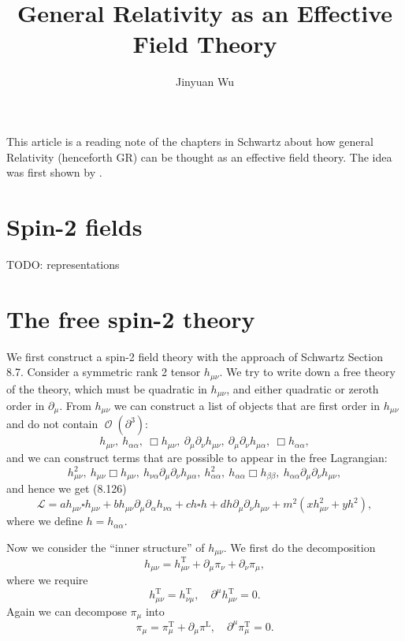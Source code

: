 \documentclass[hyperref, a4paper]{article}
\title{General Relativity as an Effective Field Theory}
\author{Jinyuan Wu}
\DeclareMathOperator{\bigO}{\mathcal{O}}
\begin{document}
\maketitle

This article is a reading note of the chapters in Schwartz about how general Relativity (henceforth GR) can
be thought as an effective field theory. The idea was first shown by \cite{1970,boulware1975193}. 

\section{Spin-2 fields}

TODO: representations

\section{The free spin-2 theory}

We first construct a spin-2 field theory with the approach of Schwartz Section 8.7. 
Consider a symmetric rank 2 tensor $h_{\mu \nu}$. We try to write down a free theory of the theory, which 
must be quadratic in $h_{\mu \nu}$, and either quadratic or zeroth order in $\partial_\mu$. From $h_{\mu \nu}$ 
we can construct a list of objects that are first order in $h_{\mu \nu}$ and do not contain $\bigO(\partial^3)$:
\[
    h_{\mu \nu},\  h_{\alpha \alpha}, \ \Box h_{\mu \nu}, \ \partial_\mu \partial_\nu h_{\mu \nu}, \ 
    \partial_\mu \partial_\nu h_{\mu \alpha}, \ \Box h_{\alpha \alpha}, 
\]
and we can construct terms that are possible to appear in the free Lagrangian:
\[
    h_{\mu \nu}^2, \ h_{\mu \nu} \Box h_{\mu \nu}, \ h_{\nu \alpha} \partial_\mu \partial_\nu h_{\mu \alpha}, 
    \ h_{\alpha \alpha}^2, \ h_{\alpha \alpha} \Box h_{\beta \beta}, \ h_{\alpha \alpha} \partial_\mu \partial_\nu h_{\mu \nu},
\]
and hence we get (8.126) 
\begin{equation}
    \mathcal{L}=a h_{\mu \nu} \square h_{\mu \nu}+b h_{\mu \nu} \partial_{\mu} \partial_{\alpha} h_{\nu \alpha}+c h \square h + d h \partial_{\mu} \partial_{\nu} h_{\mu \nu}+m^{2}\left(x h_{\mu \nu}^{2}+y h^{2}\right),
    \label{eq:general-lag}
\end{equation}
where we define $h = h_{\alpha \alpha}$. 

Now we consider the ``inner structure'' of $h_{\mu \nu}$. We first do the decomposition 
\begin{equation}
    h_{\mu \nu} = h_{\mu\nu}^\text{T} + \partial_\mu \pi_\nu + \partial_\nu \pi_\mu,
\end{equation}
where we require  
\begin{equation}
    h_{\mu \nu}^\text{T} = h_{\nu \mu}^\text{T}, \quad \partial^\mu h_{\mu \nu}^\text{T} = 0.
\end{equation}
Again we can decompose $\pi_\mu$ into 
\begin{equation}
    \pi_{\mu}=\pi_{\mu}^\text{T}+\partial_{\mu} \pi^\text{L}, \quad \partial^\mu \pi_\mu^\text{T} = 0.
\end{equation}
\end{document}

